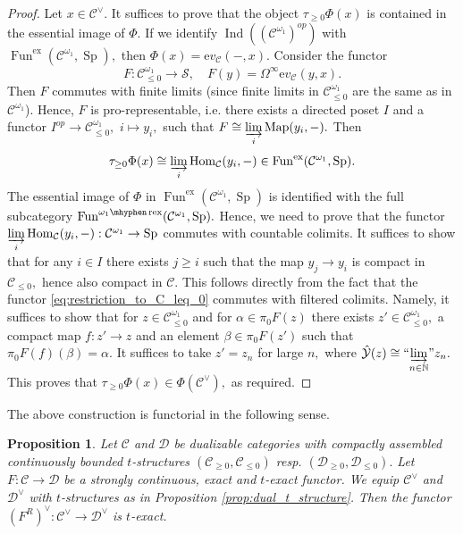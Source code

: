 \documentclass[11pt,leqno]{amsart}
\newtheorem{prop}[theo]{Proposition}
\numberwithin{equation}{section}
\def\N{\mathbb{N}}
\def\Hom{\operatorname{Hom}}
\def\Map{\operatorname{Map}}
\newcommand{\hy}{\mhyphen}
\newcommand{\indlim}[1][]{\mathop{\varinjlim}\limits_{#1}}
\newcommand{\inddlim}[1][]{{``{\indlim[#1]}"}}
\newcommand{\rex}{\operatorname{rex}}
\newcommand{\ex}{\operatorname{ex}}
\newcommand{\ev}{\mathrm ev}
\newcommand{\cD}{{\mathcal D}}
\newcommand{\cC}{{\mathcal C}}
\newcommand{\cY}{{\mathcal Y}}
\newcommand{\cS}{{\mathcal S}}
\newcommand{\Fun}{\operatorname{Fun}}
\newcommand{\Sp}{\operatorname{Sp}}
\newcommand{\Ind}{\operatorname{Ind}}
\begin{document}
\begin{proof}
Let $x\in\cC^{\vee}.$ It suffices to prove that the object $\tau_{\geq 0}\Phi(x)$ is contained in the essential image of $\Phi.$ If we identify $\Ind((\cC^{\omega_1})^{op})$ with $\Fun^{\ex}(\cC^{\omega_1},\Sp),$ then $\Phi(x)=\ev_{\cC}(-,x).$
Consider the functor
\begin{equation}\label{eq:restriction_to_C_leq_0}
F:\cC^{\omega_1}_{\leq 0}\to\cS,\quad F(y)=\Omega^{\infty}\ev_{\cC}(y,x).
\end{equation}
Then $F$ commutes with finite limits (since finite limits in $\cC^{\omega_1}_{\leq 0}$ are the same as in $\cC^{\omega_1}$). Hence, $F$ is pro-representable, i.e. there exists a directed poset $I$ and a functor $I^{op}\to \cC^{\omega_1}_{\leq 0},$ $i\mapsto y_i,$ such that $F\cong\indlim[i]\Map(y_i,-).$
Then \begin{equation*}
\tau_{\geq 0}\Phi(x)\cong \indlim[i]\Hom_{\cC}(y_i,-)\in\Fun^{\ex}(\cC^{\omega_1},\Sp).
\end{equation*}
The essential image of $\Phi$ in $\Fun^{\ex}(\cC^{\omega_1},\Sp)$ is identified with the full subcategory $\Fun^{\omega_1\hy\rex}(\cC^{\omega_1},\Sp).$ Hence, we need to prove that the functor $\indlim[i]\Hom_{\cC}(y_i,-):\cC^{\omega_1}\to\Sp$ commutes with countable colimits. It suffices to show that for any $i\in I$ there exists $j\geq i$ such that the map $y_j\to y_i$ is compact in $\cC_{\leq 0},$ hence also compact in $\cC.$ This follows directly from the fact that the functor \eqref{eq:restriction_to_C_leq_0} commutes with filtered colimits. Namely, it suffices to show that for $z\in \cC^{\omega_1}_{\leq 0}$ and for $\alpha\in\pi_0 F(z)$ there exists $z'\in\cC^{\omega_1}_{\leq 0},$ a compact map $f:z'\to z$ and an element $\beta\in\pi_0 F(z')$ such that $\pi_0 F(f)(\beta)=\alpha.$ It suffices to take $z'=z_n$ for large $n,$ where $\hat{\cY}(z)\cong\inddlim[n\in\N]z_n.$ This proves that $\tau_{\geq 0}\Phi(x)\in\Phi(\cC^{\vee}),$ as required.
\end{proof}

The above construction is functorial in the following sense.

\begin{prop}\label{prop:functorizlity_of_dual_t_structures}
Let $\cC$ and $\cD$ be dualizable categories with compactly assembled continuously bounded $t$-structures $(\cC_{\geq 0},\cC_{\leq 0})$ resp. $(\cD_{\geq 0},\cD_{\leq 0}).$ Let $F:\cC\to\cD$ be a strongly continuous, exact and $t$-exact functor. We equip $\cC^{\vee}$ and $\cD^{\vee}$ with $t$-structures as in Proposition \ref{prop:dual_t_structure}. Then the functor $(F^R)^{\vee}:\cC^{\vee}\to\cD^{\vee}$ is $t$-exact.
\end{prop}
\end{document}
